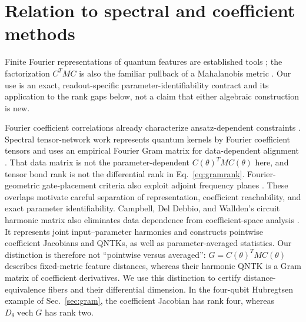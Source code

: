 \section{Relation to spectral and coefficient methods}
\label{app:spectral_context}
Finite Fourier
representations of quantum features are established tools
\cite{schuldFourier}; the factorization $C^TMC$ is also the familiar
pullback of a Mahalanobis metric \cite{weinberger}.
Our use is an exact, readout-specific parameter-identifiability
contract and its application to the rank gaps below, not a claim
that either algebraic construction is new.

Fourier coefficient correlations already characterize ansatz-dependent
constraints \cite{fingerprints}. Spectral tensor-network work represents
quantum kernels by Fourier coefficient tensors and uses an empirical
Fourier Gram matrix for data-dependent alignment \cite{spectralTN}.
That data matrix is not the parameter-dependent $C(\theta)^TMC(\theta)$
here, and tensor bond rank is not the differential rank in
Eq.~\eqref{eq:gramrank}. Fourier-geometric gate-placement criteria
also exploit adjoint frequency planes \cite{fourierDesign}.
These overlaps motivate careful separation of representation,
coefficient reachability, and exact parameter identifiability.
Campbell, Del Debbio, and Wallden's circuit harmonic matrix also
eliminates data dependence from coefficient-space analysis
\cite{CHM}. It represents joint input--parameter harmonics and
constructs pointwise coefficient Jacobians and QNTKs, as well as
parameter-averaged statistics. Our distinction is therefore not
``pointwise versus averaged'': $G=C(\theta)^TMC(\theta)$ describes
fixed-metric feature distances, whereas their harmonic QNTK is a
Gram matrix of coefficient derivatives. We use this distinction to
certify distance-equivalence fibers and their differential dimension.
In the four-qubit Hubregtsen example of Sec.~\ref{sec:gram}, the
coefficient Jacobian has rank four, whereas $D_\theta\operatorname{vech}G$
has rank two.
